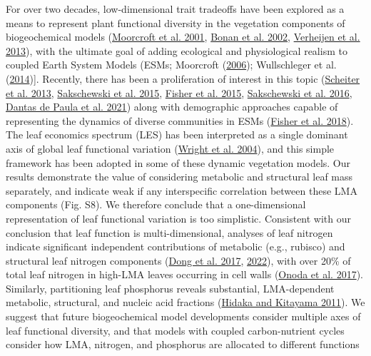 \documentclass[
  12pt,
  letterpaper,
  DIV=11,
  numbers=noendperiod]{scrartcl}
\begin{document}
For over two decades, low-dimensional trait tradeoffs have been explored
as a means to represent plant functional diversity in the vegetation
components of biogeochemical models
(\protect\hyperlink{ref-Moorcroft2001}{Moorcroft et al. 2001},
\protect\hyperlink{ref-Bonan2002}{Bonan et al. 2002},
\protect\hyperlink{ref-Verheijen2013}{Verheijen et al. 2013}), with the
ultimate goal of adding ecological and physiological realism to coupled
Earth System Models (ESMs; Moorcroft
(\protect\hyperlink{ref-Moorcroft2006}{2006}); Wullschleger et al.
(\protect\hyperlink{ref-Wullschleger2014}{2014}){]}. Recently, there has
been a proliferation of interest in this topic
(\protect\hyperlink{ref-Scheiter2013}{Scheiter et al. 2013},
\protect\hyperlink{ref-Sakschewski2015}{Sakschewski et al. 2015},
\protect\hyperlink{ref-Fisher2015}{Fisher et al. 2015},
\protect\hyperlink{ref-Sakschewski2016}{Sakschewski et al. 2016},
\protect\hyperlink{ref-DantasdePaula2021}{Dantas de Paula et al. 2021})
along with demographic approaches capable of representing the dynamics
of diverse communities in ESMs
(\protect\hyperlink{ref-Fisher2018}{Fisher et al. 2018}). The leaf
economics spectrum (LES) has been interpreted as a single dominant axis
of global leaf functional variation
(\protect\hyperlink{ref-Wright2004a}{Wright et al. 2004}), and this
simple framework has been adopted in some of these dynamic vegetation
models. Our results demonstrate the value of considering metabolic and
structural leaf mass separately, and indicate weak if any interspecific
correlation between these LMA components (Fig. S8). We therefore
conclude that a one-dimensional representation of leaf functional
variation is too simplistic. Consistent with our conclusion that leaf
function is multi-dimensional, analyses of leaf nitrogen indicate
significant independent contributions of metabolic (e.g., rubisco) and
structural leaf nitrogen components
(\protect\hyperlink{ref-Dong2017}{Dong et al. 2017},
\protect\hyperlink{ref-Dong2022}{2022}), with over 20\% of total leaf
nitrogen in high-LMA leaves occurring in cell walls
(\protect\hyperlink{ref-Onoda2017}{Onoda et al. 2017}). Similarly,
partitioning leaf phosphorus reveals substantial, LMA-dependent
metabolic, structural, and nucleic acid fractions
(\protect\hyperlink{ref-Hidaka2011}{Hidaka and Kitayama 2011}). We
suggest that future biogeochemical model developments consider multiple
axes of leaf functional diversity, and that models with coupled
carbon-nutrient cycles consider how LMA, nitrogen, and phosphorus are
allocated to different functions
\end{document}
